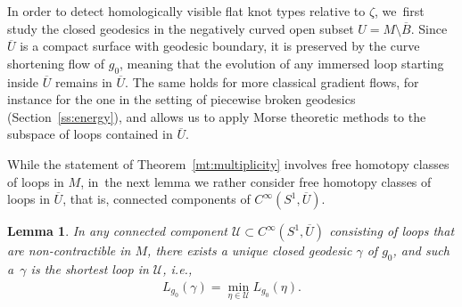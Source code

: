 \documentclass[11pt]{article}
\newcommand{\ie}{i.e.,\xspace}
\newcommand{\UU}{\mathcal{U}}
\theoremstyle{plain}
\newtheorem{Lemma}[Thm]{Lemma}
\theoremstyle{definition}
\begin{document}
In order to detect homologically visible flat knot types relative to $\zeta$, we~first study the closed geodesics in the negatively curved open subset $U=M\setminus\overline B$. Since $\overline U$ is a compact surface with geodesic boundary, it is preserved by the curve shortening flow of $g_0$, meaning that the evolution of any immersed loop starting inside $\overline U$ remains in $\overline U$. The same holds for more classical gradient flows, for instance for the one in the setting of piecewise broken geodesics (Section~\ref{ss:energy}), and allows us to apply Morse theoretic methods to the subspace of loops contained in $\overline U$.

While the statement of Theorem~\ref{mt:multiplicity} involves free homotopy classes of loops in $M$, in~the next lemma we rather consider free homotopy classes of loops in $\overline U$, that is, connected components of $C^\infty(S^1,\overline U)$.

\begin{Lemma}\label{l:unique_minimizer}
In any connected component $\UU\subset C^\infty(S^1,\overline U)$ consisting of loops that are non-contractible in $M$, there exists a unique closed geodesic $\gamma$ of $g_0$, and such a~$\gamma$ is the shortest loop in $\UU$, \ie
\begin{align*}
L_{g_0}(\gamma) = \min_{\eta\in\UU} L_{g_0}(\eta).
\end{align*}
\end{Lemma}
\end{document}
